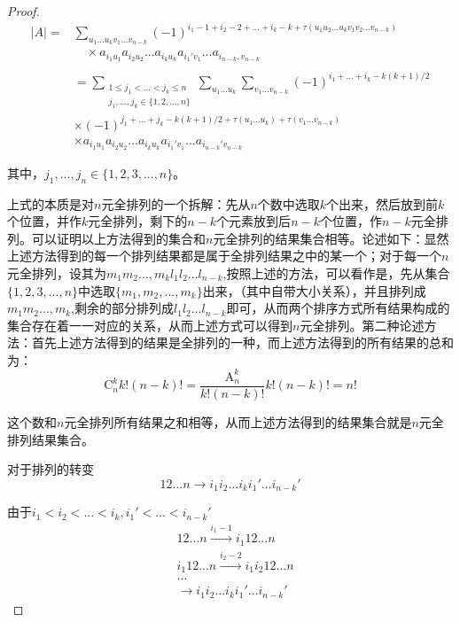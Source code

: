 \documentclass[blue,normal,cn]{elegantnote}
\begin{document}
\begin{proof}

\begin{equation*}
    \begin{aligned}
        |A|=&\sum_{u_1...u_k v_1...v_{n-k}}(-1)^{i_1-1+i_2-2+...+i_k-k+\tau(u_1u_2...u_kv_1v_2...v_{n-k})} \\
        &\quad \times a_{i_1 u_1}a_{i_2u_2}...a_{i_k u_k}a_{i_1'v_1}...a_{i_{n-k},v_{n-k}}\\
        \\
        &=\sum_{\substack{1 \leq j_1<...<j_k \leq n\\ j_1,...,j_k \in \{1,2,...,n\}}  } \sum_{u_1...u_k} \sum_{v_1...v_{n-k}} (-1)^{i_1+...+i_k-k(k+1)/2}\\
        & \times (-1)^{j_1+...+j_k-k(k+1)/2+\tau(u_1...u_k)+\tau(v_1...v_{n-k})}\\
        &\times a_{i_1 u_1}a_{i_2u_2}...a_{i_k u_k}a_{i_1'v_1}...a_{i_{n-k}'v_{n-k}}
    \end{aligned}
\end{equation*}
    

    其中，$j_1,...,j_n\in \{1,2,3,...,n\}$。

    上式的本质是对$n$元全排列的一个拆解：先从$n$个数中选取$k$个出来，然后放到前$k$个位置，并作$k$元全排列，剩下的$n-k$个元素放到后$n-k$个位置，作$n-k$元全排列。可以证明以上方法得到的集合和$n$元全排列的结果集合相等。论述如下：显然上述方法得到的每一个排列结果都是属于全排列结果之中的某一个；对于每一个$n$元全排列，设其为$m_1m_2...,m_kl_1l_2...l_{n-k}$,按照上述的方法，可以看作是，先从集合$\{1,2,3,...,n\}$中选取$\{m_1,m_2,...,m_k\}$出来，（其中自带大小关系），并且排列成$m_1m_2...,m_k$,剩余的部分排列成$l_1l_2...l_{n-k}$即可，从而两个排序方式所有结果构成的集合存在着一一对应的关系，从而上述方式可以得到$n$元全排列。第二种论述方法：首先上述方法得到的结果是全排列的一种，而上述方法得到的所有结果的总和为：
    $$
    \mathrm{C}_{n}^{k}k!(n-k)!=\frac{\mathrm{A}_n^k}{k!(n-k)!}k!(n-k)!=n!
    $$
    
    这个数和$n$元全排列所有结果之和相等，从而上述方法得到的结果集合就是$n$元全排列结果集合。

    对于排列的转变
    $$
    12...n \longrightarrow i_1i_2...i_k i_1'...i_{n-k}'
    $$
    
    由于$i_1<i_2<...<i_k,i_1'<...<i_{n-k}'$
    \begin{equation*}
        \begin{aligned}
            &12...n \stackrel{i_1-1 }\longrightarrow i_1 1 2 ... n\\
            &i_1 1 2 ... n \stackrel{i_2-2 }\longrightarrow i_1 i_2 1 2 ...n\\
            &...\\
           & \longrightarrow i_1 i_2  ... i_k i_1'...i_{n-k}'
        \end{aligned}
    \end{equation*}
    

\end{proof}
\end{document}
